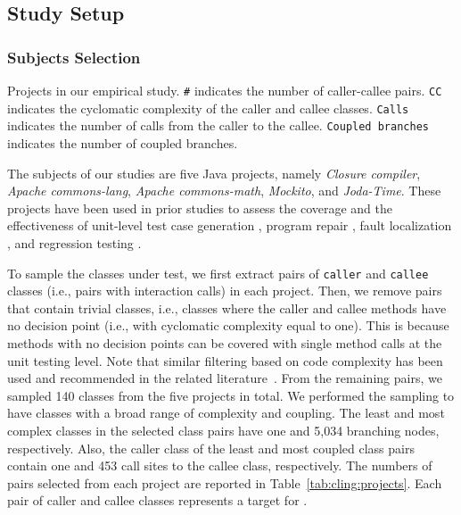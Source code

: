 \subsection{Study Setup}
\label{sec:cling:setup}

\subsubsection{Subjects Selection}

\begin{table*} [t]
	\center
	\caption{Projects in our empirical study. \texttt{\#} indicates the number of caller-callee pairs. \texttt{CC} indicates the cyclomatic complexity of the caller and callee classes. \texttt{Calls} indicates the number of calls from the caller to the callee. \texttt{Coupled branches} indicates the number of coupled branches.}
	\label{tab:cling:projects}
	
\end{table*}

The subjects of our studies are five Java projects, namely \textit{Closure compiler}, \textit{Apache commons-lang}, \textit{Apache commons-math}, \textit{Mockito}, and \textit{Joda-Time}. These 
projects have been used in prior studies to assess the coverage and the effectiveness of unit-level test case generation \cite{ma2015grt, Panichella2018, just2014defects4j, Shamshiri2016}, program repair \cite{smith2015cure, martinez2016astor}, fault localization \cite{pearson2017evaluating, b2016learning}, and regression testing \cite{noor2015similarity, lu2016does}.

To sample the classes under test, we first extract pairs of \texttt{caller} and \texttt{callee} classes (i.e., pairs with interaction calls) in each project. Then, we remove pairs that contain trivial classes, i.e., classes where the caller and callee methods have no decision point (i.e., with cyclomatic complexity equal to one). This is because methods with no decision points can be covered with single method calls at the unit testing level.
Note that similar filtering based on code complexity has been used and recommended in the related literature~\cite{Campos2017, molina2018java, Panichella2018}. From the remaining pairs, we sampled 140 classes from the five projects in total. 
We performed the sampling to have classes with a broad range of complexity and coupling. 
The least and most  complex classes in the selected class pairs have one and 5,034 branching nodes, respectively. Also, the caller class of the least and most coupled class pairs contain one and 453 call sites to the callee class, respectively. 
The numbers of pairs selected from each project are reported in Table~\ref{tab:cling:projects}. Each pair of caller and callee classes represents a target for \cling.

